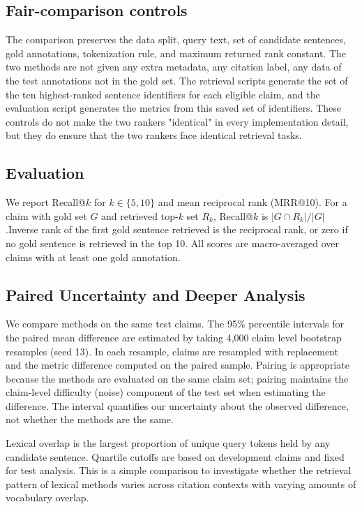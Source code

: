 \documentclass[11pt]{article}
\begin{document}
\subsection{Fair-comparison controls}
The comparison preserves the data split, query text, set of candidate sentences, gold annotations, tokenization rule, and maximum returned rank constant. The two methods are not given any extra metadata, any citation label, any data of the test annotations not in the gold set. The retrieval scripts generate the set of the ten highest-ranked sentence identifiers for each eligible claim, and the evaluation script generates the metrics from this saved set of identifiers. These controls do not make the two rankers "identical" in every implementation detail, but they do ensure that the two rankers face identical retrieval tasks.

\subsection{Evaluation}
We report Recall@$k$ for $k\in\{5,10\}$ and mean reciprocal rank (MRR@10). For a claim with gold set $G$ and retrieved top-$k$ set $R_k$, Recall@$k$ is $|G\cap R_k|/|G|$.Inverse rank of the first gold sentence retrieved is the reciprocal rank, or zero if no gold sentence is retrieved in the top 10. All scores are macro-averaged over claims with at least one gold annotation.

\subsection{Paired Uncertainty and Deeper Analysis}
We compare methods on the same test claims. The 95\% percentile intervals for the paired mean difference are estimated by taking 4,000 claim level bootstrap resamples (seed 13). In each resample, claims are resampled with replacement and the metric difference computed on the paired sample. Pairing is appropriate because the methods are evaluated on the same claim set; pairing maintains the claim-level difficulty (noise) component of the test set when estimating the difference. The interval quantifies our uncertainty about the observed difference, not whether the methods are the same.

Lexical overlap is the largest proportion of unique query tokens held by any candidate sentence. Quartile cutoffs are based on development claims and fixed for test analysis. This is a simple comparison to investigate whether the retrieval pattern of lexical methods varies across citation contexts with varying amounts of vocabulary overlap.
\end{document}
